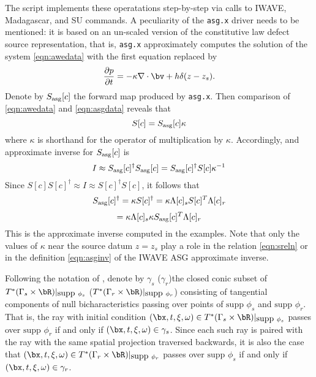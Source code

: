 The script implements these operatations step-by-step via calls to IWAVE, Madagascar, and SU commands. A peculiarity of the {\tt asg.x} driver needs to be mentioned: it is based on an un-scaled version of the constitutive law defect source representation, that is, {\tt asg.x} approximately computes the solution of the system \ref{eqn:awedata} with the first equation replaced by
\begin{equation}
\label{eqn:asgdata}
\frac{\partial p}{\partial t}  =  - \kappa \nabla \cdot \bv +
h \delta(z-z_s).
\end{equation}
Denote by $S_{\rm asg}[c]$ the forward map produced by {\tt asg.x}. Then comparison of \ref{eqn:awedata} and \ref{eqn:asgdata} reveals that
\begin{equation}
\label{eqn:sreln}
S[c]=S_{\rm asg}[c]\kappa
\end{equation}
where $\kappa$ is shorthand for the operator of multiplication by $\kappa$. Accordingly, and approximate inverse for $S_{\rm asg}[c]$ is
\[
I \approx S_{\rm asg}[c]^{\dagger}S_{\rm asg}[c] = S_{\rm asg}[c]^{\dagger}S[c]\kappa^{-1}
\]
Since $S[c]S[c]^{\dagger} \approx I \approx S[c]^{\dagger}S[c]$, it follows that
\[
S_{\rm asg}[c]^{\dagger}=\kappa S[c]^{\dagger} = \kappa\Lambda[c]_s S[c]^T \Lambda[c]_r 
\]
\begin{equation}
\label{eqn:asginv}
= \kappa \Lambda[c]_s \kappa S_{\rm asg}[c]^T\Lambda[c]_r
\end{equation}
This is the approximate inverse computed in the examples. Note that only the values of $\kappa$ near the source datum $z=z_s$ play a role in the relation \ref{eqn:sreln} or in the definition \ref{eqn:asginv} of the IWAVE ASG approximate inverse.



Following the notation of \cite{BaoSy:91b}, denote by $\gamma_s$ ($\gamma_r$)the closed conic subset of $T^*(\Gamma_s\times \bR)|_{\mbox{supp } \phi_s}$ ($T^*(\Gamma_r\times \bR)|_{\mbox{supp } \phi_r}$) consisting of tangential components of null bicharacteristics passing over points of $\mbox{supp }\phi_s$ and $\mbox{supp }\phi_r$. That is, the ray with initial condition $(\bx,t,\xi,\omega) \in T^*(\Gamma_s\times \bR)|_{\mbox{supp } \phi_s}$ passes over $\mbox{supp }\phi_r$ if and only if $(\bx,t,\xi,\omega) \in \gamma_s$. Since each such ray is paired with the ray with the same spatial projection traversed backwards, it is also the case that $(\bx,t,\xi,\omega) \in T^*(\Gamma_r\times \bR)|_{\mbox{supp } \phi_r}$ passes over $\mbox{supp }\phi_s$ if and only if $(\bx,t,\xi,\omega) \in \gamma_r$. 

